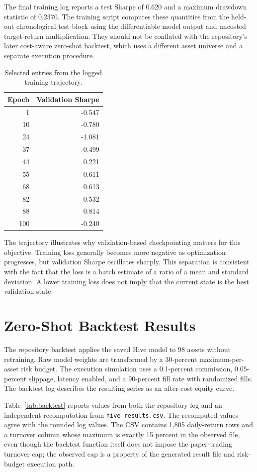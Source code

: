 \documentclass[10pt,a4paper,twocolumn]{article}
\newcommand{\code}[1]{\texttt{#1}}
\begin{document}
The final training log reports a test Sharpe of 0.620 and a maximum drawdown statistic of 0.2370. The training script computes these quantities from the held-out chronological test block using the differentiable model output and uncosted target-return multiplication. They should not be conflated with the repository's later cost-aware zero-shot backtest, which uses a different asset universe and a separate execution procedure.

\begin{table}[t]
\centering
\caption{Selected entries from the logged training trajectory.}
\label{tab:training}
\small
\begin{tabular}{@{}rr@{}}
\toprule
Epoch & Validation Sharpe \\
\midrule
1 & -0.547 \\
10 & -0.780 \\
24 & -1.081 \\
37 & -0.499 \\
44 & 0.221 \\
55 & 0.611 \\
68 & 0.613 \\
82 & 0.532 \\
88 & 0.814 \\
100 & -0.240 \\
\bottomrule
\end{tabular}
\end{table}

The trajectory illustrates why validation-based checkpointing matters for this objective. Training loss generally becomes more negative as optimization progresses, but validation Sharpe oscillates sharply. This separation is consistent with the fact that the loss is a batch estimate of a ratio of a mean and standard deviation. A lower training loss does not imply that the current state is the best validation state.

\section{Zero-Shot Backtest Results}
The repository backtest applies the saved Hive model to 98 assets without retraining. Raw model weights are transformed by a 30-percent maximum-per-asset risk budget. The execution simulation uses a 0.1-percent commission, 0.05-percent slippage, latency enabled, and a 90-percent fill rate with randomized fills. The backtest log describes the resulting series as an after-cost equity curve.

Table~\ref{tab:backtest} reports values from both the repository log and an independent recomputation from \code{hive\_results.csv}. The recomputed values agree with the rounded log values. The CSV contains 1,805 daily-return rows and a turnover column whose maximum is exactly 15 percent in the observed file, even though the backtest function itself does not impose the paper-trading turnover cap; the observed cap is a property of the generated result file and risk-budget execution path.
\end{document}
